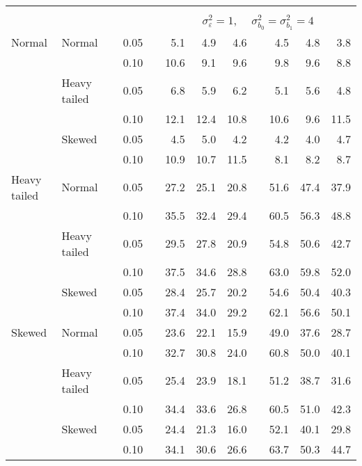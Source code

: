 \begin{table}[ht]
\begin{scriptsize}
\begin{center}
\begin{tabular}{ll p{.1cm} c p{.1cm} rrr p{.1cm} rrr}
&&&&&&&&&&&\\
& && && \multicolumn{7}{c}{$\sigma_{\varepsilon}^2 = 1$, \ \ $\sigma_{b_0}^2 = \sigma_{b_1}^2 = 4$} \\ \cline{6-12}
Normal       & Normal       && 0.05 &&   5.1 & 4.9 & 4.6 &   & 4.5 & 4.8 & 3.8 \\ 
             &              && 0.10 &&   10.6 & 9.1 & 9.6 &   & 9.8 & 9.6 & 8.8 \\ 
             & Heavy tailed && 0.05 &&   6.8 & 5.9 & 6.2 &   & 5.1 & 5.6 & 4.8 \\ 
             &              && 0.10 &&   12.1 & 12.4 & 10.8 &   & 10.6 & 9.6 & 11.5 \\ 
             & Skewed       && 0.05 &&   4.5 & 5.0 & 4.2 &   & 4.2 & 4.0 & 4.7 \\ 
             &              && 0.10 &&   10.9 & 10.7 & 11.5 &   & 8.1 & 8.2 & 8.7 \\ 
Heavy tailed & Normal       && 0.05 &&   27.2 & 25.1 & 20.8 &   & 51.6 & 47.4 & 37.9 \\ 
             &              && 0.10 &&   35.5 & 32.4 & 29.4 &   & 60.5 & 56.3 & 48.8 \\ 
             & Heavy tailed && 0.05 &&   29.5 & 27.8 & 20.9 &   & 54.8 & 50.6 & 42.7 \\ 
             &              && 0.10 &&   37.5 & 34.6 & 28.8 &   & 63.0 & 59.8 & 52.0 \\ 
             & Skewed       && 0.05 &&   28.4 & 25.7 & 20.2 &   & 54.6 & 50.4 & 40.3 \\ 
             &              && 0.10 &&   37.4 & 34.0 & 29.2 &   & 62.1 & 56.6 & 50.1 \\ 
Skewed       & Normal       && 0.05 &&   23.6 & 22.1 & 15.9 &   & 49.0 & 37.6 & 28.7 \\ 
             &              && 0.10 &&   32.7 & 30.8 & 24.0 &   & 60.8 & 50.0 & 40.1 \\ 
             & Heavy tailed && 0.05 &&   25.4 & 23.9 & 18.1 &   & 51.2 & 38.7 & 31.6 \\ 
             &              && 0.10 &&   34.4 & 33.6 & 26.8 &   & 60.5 & 51.0 & 42.3 \\ 
             & Skewed       && 0.05 &&   24.4 & 21.3 & 16.0 &   & 52.1 & 40.1 & 29.8 \\ 
             &              && 0.10 &&   34.1 & 30.6 & 26.6 &   & 63.7 & 50.3 & 44.7 \\ 


\hline
\end{tabular}
\end{center}
\end{scriptsize}
\end{table}

